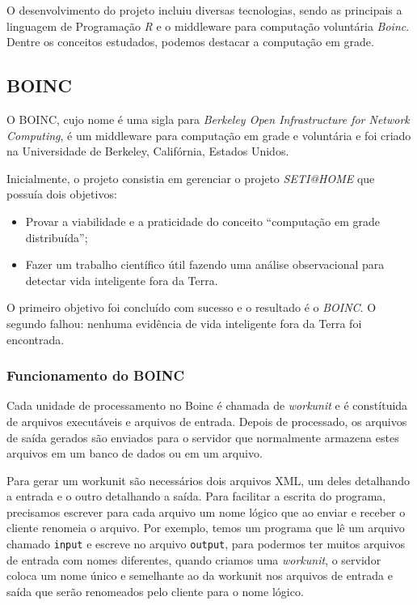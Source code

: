 O desenvolvimento do projeto incluiu diversas tecnologias, sendo as principais a linguagem de Programação \emph{R} e o middleware
para computação voluntária \emph{Boinc}. Dentre os conceitos estudados, podemos destacar a computação em grade.  

\subsection{BOINC}

O BOINC, cujo nome é uma sigla para \textit{Berkeley Open Infrastructure for Network Computing}, é um middleware 
para computação em grade e voluntária e foi criado na Universidade de Berkeley, Califórnia, Estados Unidos.

Inicialmente, o projeto consistia em gerenciar o projeto \textit{SETI@HOME} que possuía dois objetivos:

\begin{itemize}
	\item Provar a viabilidade e a praticidade do conceito ``computação em grade distribuída'';
	\item Fazer um trabalho científico útil fazendo uma análise observacional para detectar vida inteligente fora da Terra.
\end{itemize}

O primeiro objetivo foi concluído com sucesso e o resultado é o \textit{BOINC}. O segundo falhou: nenhuma evidência de 
vida inteligente fora da Terra foi encontrada. 

\subsubsection{Funcionamento do BOINC}

Cada unidade de processamento no Boinc é chamada de \emph{workunit} e é constítuida de arquivos executáveis e 
arquivos de entrada. Depois de processado, os arquivos de saída gerados são enviados para o servidor que
normalmente armazena estes arquivos em um banco de dados ou em um arquivo.

Para gerar um workunit são necessários dois arquivos XML, um deles detalhando a entrada e o 
outro detalhando a saída. Para facilitar a escrita do programa, precisamos escrever para cada arquivo um nome lógico 
que ao enviar e receber o cliente renomeia o arquivo. Por exemplo, temos um programa que lê um arquivo chamado 
\verb#input# e escreve no arquivo \verb#output#, para podermos ter muitos arquivos de entrada com nomes diferentes, quando
criamos uma \emph{workunit}, o servidor coloca um nome único e semelhante ao da workunit nos arquivos de entrada e saída que serão renomeados
pelo cliente para o nome lógico.

